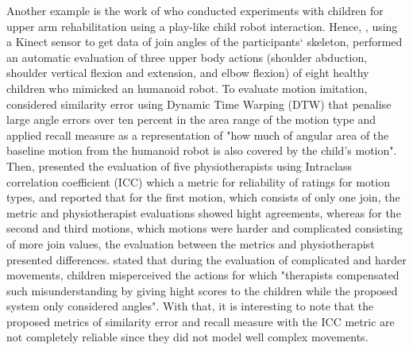 
Another example is the work of \cite{guneysu2014} who conducted experiments 
with children for upper 
arm rehabilitation using a play-like child robot interaction.
Hence, \cite{guneysu2014}, using a Kinect sensor to get data of join angles of 
the participants` skeleton, performed an automatic evaluation of three upper body 
actions (shoulder abduction, shoulder vertical flexion and extension, 
and elbow flexion) of eight healthy children who mimicked an humanoid robot.
To evaluate motion imitation, \citealt[p. 202]{guneysu2014} considered similarity 
error using Dynamic Time Warping (DTW) that penalise large angle errors over ten 
percent in the area range of the motion type and applied recall measure 
as a representation of "how much of angular area of the baseline motion
from the humanoid robot is also covered by the child's motion".
Then, \cite{guneysu2014} presented the evaluation of five physiotherapists using 
Intraclass correlation coefficient (ICC) which a metric for reliability of 
ratings for motion types, and reported that for the first motion, which 
consists of only one join, the metric and physiotherapist evaluations 
showed hight agreements, whereas for the second and third motions, 
which motions were harder and complicated consisting of more join values, 
the evaluation between the metrics and physiotherapist presented differences.
\citealt[p. 203]{guneysu2014} stated that during the evaluation of complicated 
and harder movements, children misperceived the actions for which "therapists
compensated such misunderstanding by giving hight scores to the children
while the proposed system only considered angles".
With that, it is interesting to note that the proposed metrics of similarity 
error and recall measure with the ICC metric are not completely reliable since 
they did not model well complex movements.
